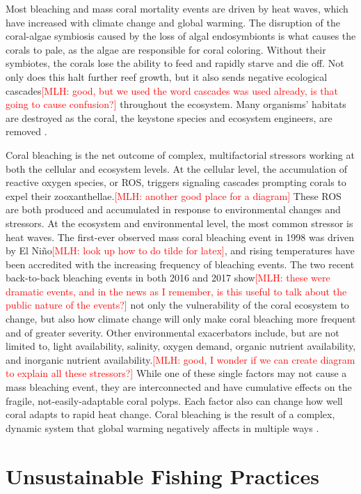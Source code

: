 \documentclass{book}\usepackage{knitr}
\newcommand{\red}[1]{\textcolor{red}{[MLH: #1]}}
\begin{document}
{Most bleaching and mass coral mortality events are driven by heat waves, which have increased with climate change and global warming. The disruption of the coral-algae symbiosis caused by the loss of algal endosymbionts is what causes the corals to pale, as the algae are responsible for coral coloring. Without their symbiotes, the corals lose the ability to feed and rapidly starve and die off. Not only does this halt further reef growth, but it also sends negative ecological cascades\red{good, but we used the word cascades was used already, is that going to cause confusion?} throughout the ecosystem. Many organisms' habitats are destroyed as the coral, the keystone species and ecosystem engineers, are removed \citep{https://doi.org/10.1111/gcb.14871}.

Coral bleaching is the net outcome of complex, multifactorial stressors working at both the cellular and ecosystem levels. At the cellular level, the accumulation of reactive oxygen species, or ROS, triggers signaling cascades prompting corals to expel their zooxanthellae.\red{another good place for a diagram} These ROS are both produced and accumulated in response to environmental changes and stressors. At the ecosystem and environmental level, the most common stressor is heat waves. The first-ever observed mass coral bleaching event in 1998 was driven by El Niño\red{look up how to do tilde for latex}, and rising temperatures have been accredited with the increasing frequency of bleaching events. The two recent back-to-back bleaching events in both 2016 and 2017 show\red{these were dramatic events,  and in the news as I remember, is this useful to talk about the public nature of the events?} not only the vulnerability of the coral ecosystem to change, but also how climate change will only make coral bleaching more frequent and of greater severity. Other environmental exacerbators include, but are not limited to, light availability, salinity, oxygen demand, organic nutrient availability, and inorganic nutrient availability.\red{good, I wonder if we can create diagram to explain all these stressors?} While one of these single factors may not cause a mass bleaching event, they are interconnected and have cumulative effects on the fragile, not-easily-adaptable coral polyps. Each factor also can change how well coral adapts to rapid heat change. Coral bleaching is the result of a complex, dynamic system that global warming negatively affects in multiple ways \citep{https://doi.org/10.1111/gcb.14871}.

\section{Unsustainable Fishing Practices}

}
\end{document}
